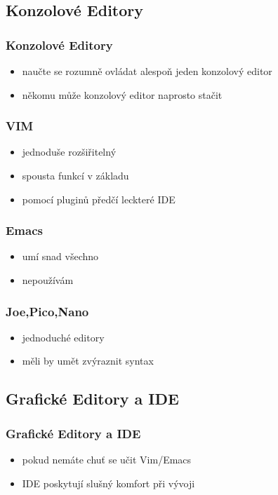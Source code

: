 \subsection{Konzolové Editory}

\begin{frame}
	\frametitle{Konzolové Editory}
	\begin{itemize}
		\item{naučte se rozumně ovládat alespoň jeden konzolový editor}
		\item{někomu může konzolový editor naprosto stačit}
	\end{itemize}
\end{frame}

\begin{frame}
	\frametitle{VIM}
	\begin{itemize}
		\item{jednoduše rozšiřitelný}
		\item{spousta funkcí v základu}
		\item{pomocí pluginů předčí leckteré IDE}
	\end{itemize}
\end{frame}

\begin{frame}
	\frametitle{Emacs}
	\begin{itemize}
		\item{umí snad všechno}
		\item{nepoužívám}
	\end{itemize}
\end{frame}

\begin{frame}
	\frametitle{Joe,Pico,Nano}
	\begin{itemize}
		\item{jednoduché editory}
		\item{měli by umět zvýraznit syntax}
	\end{itemize}
\end{frame}

\subsection{Grafické Editory a IDE}

\begin{frame}
	\frametitle{Grafické Editory a IDE}
	\begin{itemize}
		\item{pokud nemáte chuť se učit Vim/Emacs}
		\item{IDE poskytují slušný komfort při vývoji}
	\end{itemize}
\end{frame}

